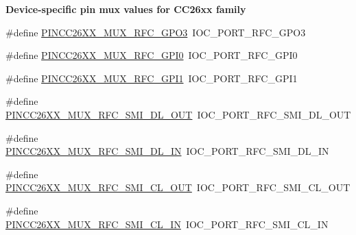 \begin{Indent}{\bf Device-\/specific pin mux values for C\-C26xx family}
\begin{DoxyCompactItemize}
\item 
\#define \hyperlink{_p_i_n_c_c26_x_x_8h_adc5890a2a1333e956349ed23bbe49d10}{P\-I\-N\-C\-C26\-X\-X\-\_\-\-M\-U\-X\-\_\-\-R\-F\-C\-\_\-\-G\-P\-O3}~I\-O\-C\-\_\-\-P\-O\-R\-T\-\_\-\-R\-F\-C\-\_\-\-G\-P\-O3
\item 
\#define \hyperlink{_p_i_n_c_c26_x_x_8h_acb09fb065bb0d5951baa8a6441471854}{P\-I\-N\-C\-C26\-X\-X\-\_\-\-M\-U\-X\-\_\-\-R\-F\-C\-\_\-\-G\-P\-I0}~I\-O\-C\-\_\-\-P\-O\-R\-T\-\_\-\-R\-F\-C\-\_\-\-G\-P\-I0
\item 
\#define \hyperlink{_p_i_n_c_c26_x_x_8h_a71f92d2ec8410256434ce0968476a749}{P\-I\-N\-C\-C26\-X\-X\-\_\-\-M\-U\-X\-\_\-\-R\-F\-C\-\_\-\-G\-P\-I1}~I\-O\-C\-\_\-\-P\-O\-R\-T\-\_\-\-R\-F\-C\-\_\-\-G\-P\-I1
\item 
\#define \hyperlink{_p_i_n_c_c26_x_x_8h_ad92f4bc3d98cd1363bac0beb6238c7c2}{P\-I\-N\-C\-C26\-X\-X\-\_\-\-M\-U\-X\-\_\-\-R\-F\-C\-\_\-\-S\-M\-I\-\_\-\-D\-L\-\_\-\-O\-U\-T}~I\-O\-C\-\_\-\-P\-O\-R\-T\-\_\-\-R\-F\-C\-\_\-\-S\-M\-I\-\_\-\-D\-L\-\_\-\-O\-U\-T
\item 
\#define \hyperlink{_p_i_n_c_c26_x_x_8h_abb958dd1da8d7fab19495a9d70cfc2cb}{P\-I\-N\-C\-C26\-X\-X\-\_\-\-M\-U\-X\-\_\-\-R\-F\-C\-\_\-\-S\-M\-I\-\_\-\-D\-L\-\_\-\-I\-N}~I\-O\-C\-\_\-\-P\-O\-R\-T\-\_\-\-R\-F\-C\-\_\-\-S\-M\-I\-\_\-\-D\-L\-\_\-\-I\-N
\item 
\#define \hyperlink{_p_i_n_c_c26_x_x_8h_a23575044cc0b9a4ce8b680339672f024}{P\-I\-N\-C\-C26\-X\-X\-\_\-\-M\-U\-X\-\_\-\-R\-F\-C\-\_\-\-S\-M\-I\-\_\-\-C\-L\-\_\-\-O\-U\-T}~I\-O\-C\-\_\-\-P\-O\-R\-T\-\_\-\-R\-F\-C\-\_\-\-S\-M\-I\-\_\-\-C\-L\-\_\-\-O\-U\-T
\item 
\#define \hyperlink{_p_i_n_c_c26_x_x_8h_af897af5e1ed1dff451e4ae505eea3f2d}{P\-I\-N\-C\-C26\-X\-X\-\_\-\-M\-U\-X\-\_\-\-R\-F\-C\-\_\-\-S\-M\-I\-\_\-\-C\-L\-\_\-\-I\-N}~I\-O\-C\-\_\-\-P\-O\-R\-T\-\_\-\-R\-F\-C\-\_\-\-S\-M\-I\-\_\-\-C\-L\-\_\-\-I\-N
\end{DoxyCompactItemize}
\end{Indent}
